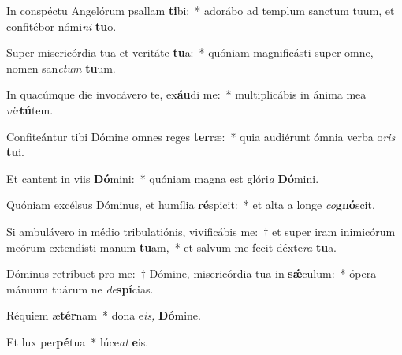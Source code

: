 \item In conspéctu Angelórum psallam \textbf{ti}bi:~* adorábo ad templum sanctum tuum, et confitébor nómi\textit{ni} \textbf{tu}o.
\item Super misericórdia tua et veritáte \textbf{tu}a:~* quóniam magnificásti super omne, nomen san\textit{ctum} \textbf{tu}um.
\item In quacúmque die invocávero te, ex\textbf{áu}di me:~* multiplicábis in ánima mea \textit{vir}\textbf{tú}tem.
\item Confiteántur tibi Dómine omnes reges \textbf{ter}ræ:~* quia audiérunt ómnia verba o\textit{ris} \textbf{tu}i.
\item Et cantent in viis \textbf{Dó}mini:~* quóniam magna est glóri\tinyhspace\textit{a} \textbf{Dó}mini.
\item Quóniam excélsus Dóminus, et humília \textbf{ré}spicit:~* et alta a longe \textit{co}\textbf{gnó}scit.
\item Si ambulávero in médio tribulatiónis, vivificábis me:~† et super iram inimicórum meórum extendísti manum \textbf{tu}am,~* et salvum me fecit déxte\tinyhspace\textit{ra} \textbf{tu}a.
\item Dóminus retríbuet pro me:~† Dómine, misericórdia tua in \textbf{sǽ}culum:~* ópera mánuum tuárum ne \textit{de}\textbf{spí}cias.
\item Réquiem æ\textbf{tér}nam~* dona e\textit{is,} \textbf{Dó}mine.
\item Et lux per\textbf{pé}tua~* lúce\textit{at} \textbf{e}is.